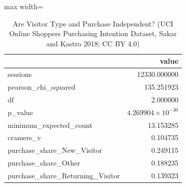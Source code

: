 \begin{table}[htbp]
\centering
\caption{Are Visitor Type and Purchase Independent? (UCI Online Shoppers Purchasing Intention Dataset, Sakar and Kastro 2018; CC BY 4.0)}
\begingroup
\small
\setlength{\tabcolsep}{6pt}
\renewcommand{\arraystretch}{1.12}
\begin{adjustbox}{max width=\linewidth}
\begin{tabular}{@{}lr@{}}
\toprule
 & value \\
\midrule
sessions & 12330.000000 \\
pearson\_chi\_squared & 135.251923 \\
df & 2.000000 \\
p\_value & $4.269904 \times 10^{-30}$ \\
minimum\_expected\_count & 13.153285 \\
cramers\_v & 0.104735 \\
purchase\_share\_New\_Visitor & 0.249115 \\
purchase\_share\_Other & 0.188235 \\
purchase\_share\_Returning\_Visitor & 0.139323 \\
\bottomrule
\end{tabular}
\end{adjustbox}
\endgroup
\end{table}